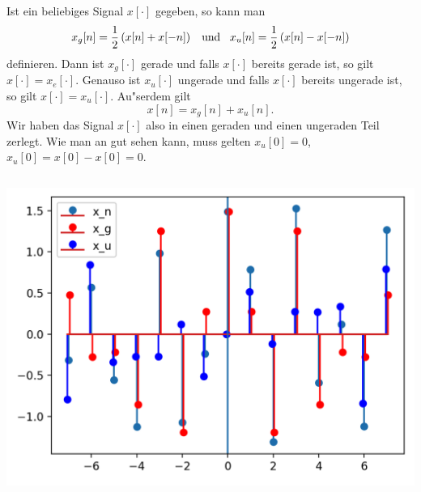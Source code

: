 Ist ein beliebiges Signal $x[\cdot]$ gegeben, so kann man
\[
    x_g[n] = \frac 12 \left(x[n] + x[-n]\right)
    {\hspace{3mm} \text{und} \hspace{3mm}}
    x_u[n] = \frac 12 \left(x[n] - x[-n]\right)
\]
definieren.
Dann ist $x_g[\cdot]$ gerade und falls $x[\cdot]$ bereits gerade ist, so gilt $x[\cdot] = x_e[\cdot]$.
Genauso ist $x_u[\cdot]$ ungerade und falls $x[\cdot]$ bereits ungerade ist, so gilt $x[\cdot] = x_u[\cdot]$.
Au"serdem gilt
\[
x[n] = x_g[n] + x_u[n].
\]
Wir haben das Signal $x[\cdot]$ also in einen geraden und einen ungeraden Teil zerlegt.
Wie man an  gut sehen kann, muss gelten $x_u[0] =0$, $x_u[0] = x[0] - x[0] = 0$.
%
\begin{listing}
    \noindent
    \begin{minipage}{0.49\textwidth}
        \strut\vspace*{-\baselineskip}\newline
        \inputminted[firstline=4]{python3}{code/even_odd.py}
    \end{minipage}%
    \begin{minipage}{0.49\textwidth}
        \strut\vspace*{-\baselineskip}\newline
        \includegraphics[width=\textwidth]{code/even_odd.png}
    \end{minipage}
    \label{py:even_odd}
\end{listing}
%
